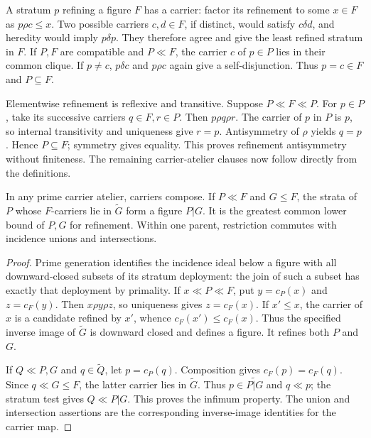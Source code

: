 A stratum $p$ refining a figure $F$ has a carrier: factor its
refinement to some $x\in F$ as $p\rho c\leq x$.
Two possible carriers $c,d\in F$, if distinct, would satisfy
$c\delta d$, and heredity would imply $p\delta p$.
They therefore agree and give the least refined stratum in $F$.
If $P,F$ are compatible and $P\ll F$, the carrier $c$ of
$p\in P$ lies in their common clique. If $p\ne c$,
$p\delta c$ and $p\rho c$ again give a self-disjunction.
Thus $p=c\in F$ and $P\subseteq F$.

Elementwise refinement is reflexive and transitive. Suppose
$P\ll F\ll P$. For $p\in P$, take its successive carriers
$q\in F,r\in P$. Then $p\rho q\rho r$.
The carrier of $p$ in $P$ is $p$, so internal transitivity and
uniqueness give $r=p$. Antisymmetry of $\rho$ yields $q=p$.
Hence $P\subseteq F$; symmetry gives equality. This proves
refinement antisymmetry without finiteness. The remaining
carrier-atelier clauses now follow directly from the definitions.

\begin{proposition}
\label{prop:abstract-carriers}
In any prime carrier atelier, carriers compose. If $P\ll F$
and $G\leq F$, the strata of $P$ whose $F$-carriers lie in
$\widetilde G$ form a figure $P|G$. It is the greatest common
lower bound of $P,G$ for refinement. Within one parent,
restriction commutes with incidence unions and intersections.
\end{proposition}
\begin{proof}
Prime generation identifies the incidence ideal below a figure
with all downward-closed subsets of its stratum deployment:
the join of such a subset has exactly that deployment by primality.
If $x\ll P\ll F$, put $y=c_P(x)$ and $z=c_F(y)$.
Then $x\rho y\rho z$, so uniqueness gives $z=c_F(x)$.
If $x'\leq x$, the carrier of $x$ is a candidate refined by
$x'$, whence $c_F(x')\leq c_F(x)$. Thus the specified inverse
image of $\widetilde G$ is downward closed and defines a figure.
It refines both $P$ and $G$.

If $Q\ll P,G$ and $q\in\widetilde Q$, let $p=c_P(q)$.
Composition gives $c_F(p)=c_F(q)$. Since $q\ll G\leq F$,
the latter carrier lies in $\widetilde G$.
Thus $p\in\widetilde{P|G}$ and $q\ll p$; the stratum
test gives $Q\ll P|G$. This proves the infimum property.
The union and intersection assertions are the corresponding
inverse-image identities for the carrier map.
\end{proof}

